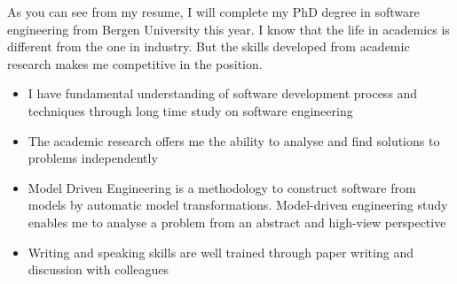\documentclass[12pt,letterpaper]{article}
\begin{document}
As you can see from my resume, I will complete my PhD degree in software engineering from Bergen University this year.
I know that the life in academics is different from the one in industry.
But the skills developed from academic research makes me competitive in the position.
\begin{itemize}
\item I have fundamental understanding of  software development process and techniques through long time study on software engineering
\item The academic research offers me the ability to analyse and find solutions to problems independently
\item Model Driven Engineering is a methodology to construct software from models by automatic model transformations. Model-driven engineering study enables me to analyse a problem from an abstract and high-view perspective
\item Writing and speaking skills are well trained through paper writing and discussion with colleagues
\end{itemize}
%
%
\end{document}
